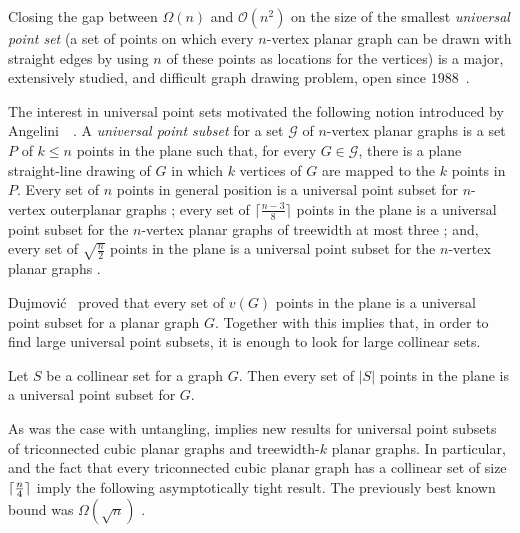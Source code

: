 Closing the gap between $\Omega(n)$ and $\mathcal{O}(n^2)$ on the size of the
smallest \emph{universal point set} (a set of points on which
every $n$-vertex planar graph can be drawn with straight edges by using $n$ of these
points as locations for the vertices) is a major, extensively studied, and difficult graph
drawing problem, open since
$1988$~\cite{%
  dFPP90, DBLP:journals/ipl/Kurowski04, DBLP:journals/jgaa/BannisterCDE14}. 
  
The interest in universal point sets motivated the following notion introduced by Angelini~\etal~\cite{abehlmmo-ups-12}. 
A \emph{universal point subset} for  a set $\mathcal{G}$ of $n$-vertex planar graphs is a
set $P$ of $k\leq n$ points in the plane such that, for every
$G\in\mathcal{G}$, there is a plane straight-line
drawing of $G$ in which $k$ vertices of $G$ are mapped to the $k$
points in $P$. Every set of $n$ points in general position is a
universal point subset for $n$-vertex outerplanar graphs
\cite{GMPP,DBLP:journals/comgeo/Bose02,DBLP:conf/cccg/CastanedaU96};  every
set of $\lceil \frac{n-3}{8}\rceil$ points in the plane is a universal
point subset for the $n$-vertex planar graphs of treewidth at most
three \cite{dalozzo.dujmovic.ea:drawing}; and, every set of $\sqrt{\frac{n}{2}}$ points in the plane is a universal point
subset for the $n$-vertex planar graphs \cite{dujmovic:utility}. 

Dujmovi\'c~\cite{dujmovic:utility}
  proved that every set of $v(G)$ points in the plane is a universal point subset
  for a planar graph $G$. Together with  this implies
  that, in order to find large universal point subsets, it is enough to look for large collinear sets.

\begin{thm}
Let $S$ be a collinear set for a graph $G$. Then every set of $|S|$ points in the
plane is a universal point subset for $G$.
\end{thm}

As was the case with untangling,  implies new results
for universal point subsets of triconnected cubic planar graphs and
treewidth-$k$ planar graphs. In particular,  and the
fact that every triconnected cubic planar graph has a collinear set of
size ${\lceil \frac{n}{4} \rceil}$ \cite{dalozzo.dujmovic.ea:drawing} imply the
following asymptotically tight result. The previously best known bound
was $\Omega(\sqrt{n})$ \cite{dujmovic:utility}.

